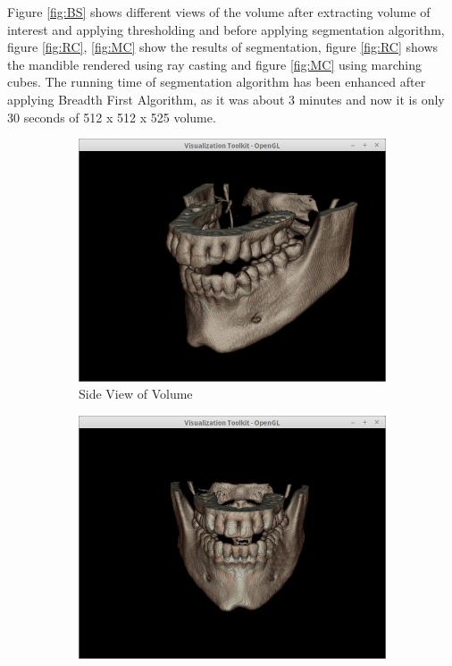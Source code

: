 \documentclass[10pt, b5paper]{article}
\begin{document}
Figure \ref{fig:BS} shows different views of the volume after extracting volume of interest and applying thresholding and before applying segmentation algorithm, figure \ref{fig:RC}, \ref{fig:MC} show the results of segmentation, figure \ref{fig:RC} shows the  mandible rendered using ray casting and figure \ref{fig:MC} using marching cubes. The running time of segmentation algorithm has been enhanced after applying Breadth First Algorithm, as it was about  3 minutes and now it is only 30 seconds of 512 x 512 x 525 volume. 

\begin{figure}
    \centering
    \begin{subfigure}[b]{0.33\textwidth}
        \centering
        \includegraphics[width=\textwidth]{BSS}
        \caption{Side View of Volume}
    \end{subfigure}
    \hfill
    \begin{subfigure}[b]{0.33\textwidth}
        \centering
        \includegraphics[width=\textwidth]{BSF}

\end{subfigure}
\end{figure}
\end{document}
